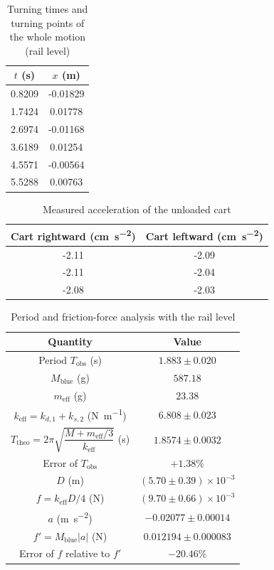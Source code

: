 \begin{table}[htb!]
\centering
\caption{Turning times and turning points of the whole motion (rail level)}
\begin{tabular}{cc}
\toprule
$t$ (\unit{\s}) & $x$ (\unit{\m}) \\
\midrule
0.8209 & -0.01829 \\
1.7424 & 0.01778 \\
2.6974 & -0.01168 \\
3.6189 & 0.01254 \\
4.5571 & -0.00564 \\
5.5288 & 0.00763 \\
\bottomrule
\end{tabular}
\end{table}
\begin{table}[htb!]
\centering
\caption{Measured acceleration of the unloaded cart}
\begin{tabular}{cc}
\toprule
Cart rightward (\unit{\cm\per\s\squared}) & Cart leftward (\unit{\cm\per\s\squared}) \\
\midrule
-2.11 & -2.09 \\
-2.11 & -2.04 \\
-2.08 & -2.03 \\
\bottomrule
\end{tabular}
\end{table}
\begin{table}[htb!]
\centering
\caption{Period and friction-force analysis with the rail level}
\begin{tabular}{cc}
\toprule
Quantity & Value \\
\midrule
Period $T_{\text{obs}}$ (\unit{\s}) & $1.883 \pm 0.020$ \\
$M_{\text{blue}}$ (\unit{\g}) & $587.18$ \\
$m_{\text{eff}}$ (\unit{\g}) & $23.38$ \\
$k_{\text{eff}}=k_{d,1}+k_{s,2}$ (\unit{\N\per\m}) & $6.808 \pm 0.023$ \\
$T_{\text{theo}}=2\pi \sqrt{ \dfrac{M+m_{\text{eff}} /3}{k_{\text{eff}}} }$ (\unit{\s}) & $1.8574 \pm 0.0032$ \\
Error of $T_{\text{obs}}$ & $+1.38\%$ \\
$D$ (\unit{\m}) & $(5.70 \pm 0.39)\times 10^{-3}$ \\
$f=k_{\text{eff}}D/4$ (\unit{\N}) & $(9.70 \pm 0.66)\times 10^{-3}$ \\
$a$ (\unit{\m\per\s\squared}) & $-0.02077 \pm 0.00014$ \\
$f'=M_{\text{blue}}|a|$ (\unit{\N}) & $0.012194 \pm 0.000083$ \\
Error of $f$ relative to $f'$ & $-20.46\%$ \\
\bottomrule
\end{tabular}
\end{table}
